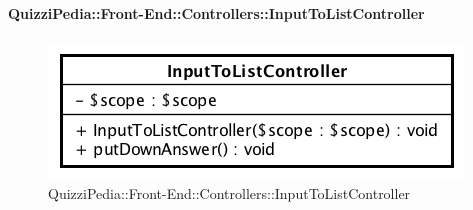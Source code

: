 \paragraph{QuizziPedia::Front-End::Controllers::InputToListController}
\begin{figure} [ht]
	\centering
	\includegraphics[scale=0.45]{UML/Classi/Front-End/QuizziPedia_Front-end_Controller_InputToListController.png}
	\caption{QuizziPedia::Front-End::Controllers::InputToListController}
\end{figure} \FloatBarrier
